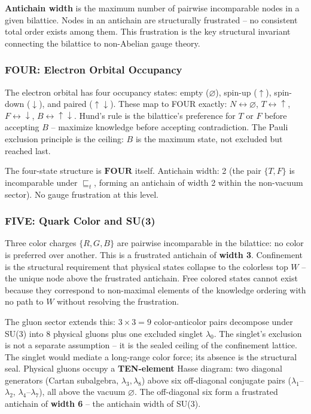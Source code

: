 \documentclass[12pt,a4paper]{article}
\begin{document}
\textbf{Antichain width} is the maximum number of pairwise incomparable
nodes in a given bilattice. Nodes in an antichain are structurally
frustrated -- no consistent total order exists among them. This
frustration is the key structural invariant connecting the bilattice to
non-Abelian gauge theory.

\hypertarget{four-electron-orbital-occupancy}{%
\subsubsection{FOUR: Electron Orbital
Occupancy}\label{four-electron-orbital-occupancy}}

The electron orbital has four occupancy states: empty (\(\varnothing\)),
spin-up (\(\uparrow\)), spin-down (\(\downarrow\)), and paired
(\(\uparrow\downarrow\)). These map to FOUR exactly:
\(N \leftrightarrow \varnothing\), \(T \leftrightarrow \uparrow\),
\(F \leftrightarrow \downarrow\),
\(B \leftrightarrow \uparrow\downarrow\). Hund's rule is the bilattice's
preference for \(T\) or \(F\) before accepting \(B\) -- maximize
knowledge before accepting contradiction. The Pauli exclusion principle
is the ceiling: \(B\) is the maximum state, not excluded but reached
last.

The four-state structure is \(\mathbf{FOUR}\) itself. Antichain width: 2
(the pair \(\{T, F\}\) is incomparable under \(\sqsubseteq_t\), forming
an antichain of width 2 within the non-vacuum sector). No gauge
frustration at this level.

\hypertarget{five-quark-color-and-su3}{%
\subsubsection{FIVE: Quark Color and
SU(3)}\label{five-quark-color-and-su3}}

Three color charges \(\{R, G, B\}\) are pairwise incomparable in the
bilattice: no color is preferred over another. This is a frustrated
antichain of \textbf{width 3}. Confinement is the structural requirement
that physical states collapse to the colorless top \(W\) -- the unique
node above the frustrated antichain. Free colored states cannot exist
because they correspond to non-maximal elements of the knowledge
ordering with no path to \(W\) without resolving the frustration.

The gluon sector extends this: \(3 \times 3 = 9\) color-anticolor pairs
decompose under SU(3) into 8 physical gluons plus one excluded singlet
\(\lambda_0\). The singlet's exclusion is not a separate assumption --
it is the sealed ceiling of the confinement lattice. The singlet would
mediate a long-range color force; its absence is the structural seal.
Physical gluons occupy a \textbf{TEN-element} Hasse diagram: two
diagonal generators (Cartan subalgebra, \(\lambda_3, \lambda_8\)) above
six off-diagonal conjugate pairs (\(\lambda_1\)--\(\lambda_2\),
\(\lambda_4\)--\(\lambda_7\)), all above the vacuum \(\varnothing\). The
off-diagonal six form a frustrated antichain of \textbf{width 6} -- the
antichain width of SU(3).
\end{document}
